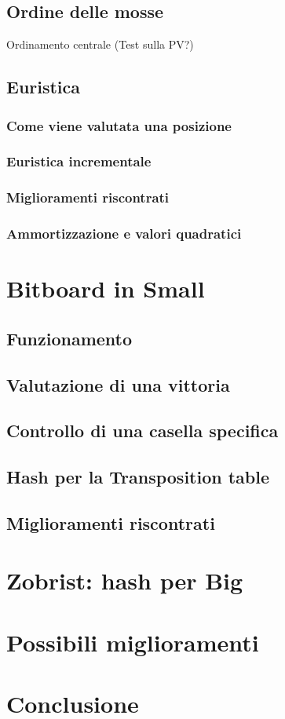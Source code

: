 \documentclass[a4paper]{article}
\begin{document}
\subsection{Ordine delle mosse}
Ordinamento centrale
(Test sulla PV?)

\subsection{Euristica}
\subsubsection{Come viene valutata una posizione}
\subsubsection{Euristica incrementale}
\subsubsection{Miglioramenti riscontrati}
\subsubsection{Ammortizzazione e valori quadratici}

\section{Bitboard in Small}
\label{sec_bitboard}
\subsection{Funzionamento}
\subsection{Valutazione di una vittoria}
\subsection{Controllo di una casella specifica}
\subsection{Hash per la Transposition table}
\subsection{Miglioramenti riscontrati}

\section{Zobrist: hash per Big}

\section{Possibili miglioramenti}
\section{Conclusione}
\end{document}
